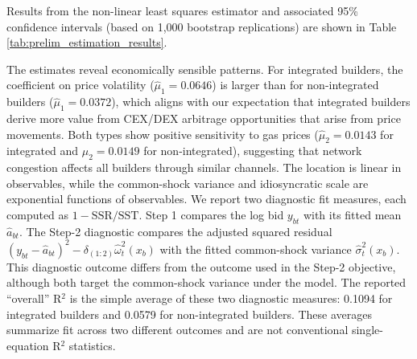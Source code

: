 \documentclass[12pt,reqno]{amsart}
\begin{document}
Results from the non-linear least squares estimator and associated 95\% confidence intervals (based on 1,000 bootstrap replications) are shown in Table \ref{tab:prelim_estimation_results}.

The estimates reveal economically sensible patterns. For integrated builders, the coefficient on price volatility ($\hat{\mu}_1 = 0.0646$) is larger than for non-integrated builders ($\hat{\mu}_1 = 0.0372$), which aligns with our expectation that integrated builders derive more value from CEX/DEX arbitrage opportunities that arise from price movements. Both types show positive sensitivity to gas prices ($\hat{\mu}_2 = 0.0143$ for integrated and $\hat{\mu}_2 = 0.0149$ for non-integrated), suggesting that network congestion affects all builders through similar channels. The location is linear in observables, while the common-shock variance and idiosyncratic scale are exponential functions of observables. We report two diagnostic fit measures, each computed as $1-\text{SSR}/\text{SST}$. Step 1 compares the log bid $y_{bt}$ with its fitted mean $\widehat a_{bt}$. The Step-2 diagnostic compares the adjusted squared residual $(y_{bt}-\widehat a_{bt})^2-\delta_{(1:2)}\widehat\omega_t^2(x_b)$ with the fitted common-shock variance $\widehat\sigma_t^2(x_b)$. This diagnostic outcome differs from the outcome used in the Step-2 objective, although both target the common-shock variance under the model. The reported ``overall'' R$^2$ is the simple average of these two diagnostic measures: 0.1094 for integrated builders and 0.0579 for non-integrated builders. These averages summarize fit across two different outcomes and are not conventional single-equation R$^2$ statistics.
\end{document}
